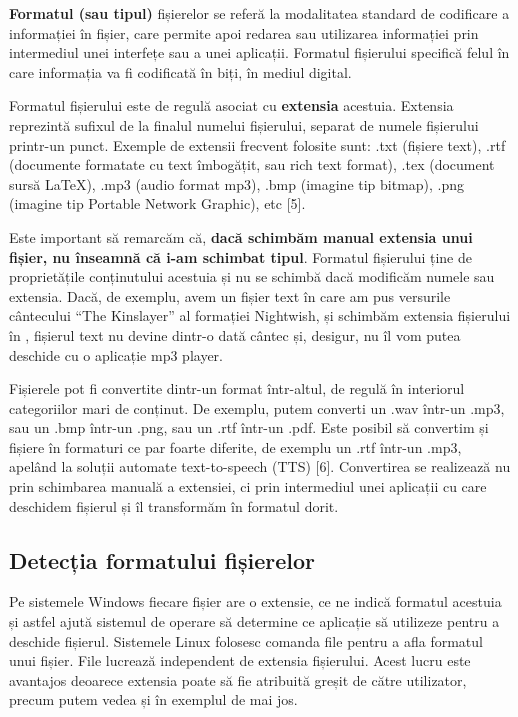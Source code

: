 \textbf{Formatul (sau tipul)} fișierelor se referă la modalitatea standard de
codificare a informației în fișier, care permite apoi redarea sau utilizarea
informației prin intermediul unei interfețe sau a unei aplicații. Formatul
fișierului specifică felul în care informația va fi codificată în biți, în
mediul digital.

Formatul fișierului este de regulă asociat cu \textbf{extensia} acestuia.
Extensia reprezintă sufixul de la finalul numelui fișierului, separat de numele
fișierului printr-un punct. Exemple de extensii frecvent folosite sunt: .txt
(fișiere text), .rtf (documente formatate cu text îmbogățit, sau rich text
format), .tex (document sursă LaTeX), .mp3 (audio format mp3), .bmp (imagine tip
bitmap), .png (imagine tip Portable Network Graphic), etc [5].

Este important să remarcăm că, \textbf{dacă schimbăm manual extensia unui
fișier, nu înseamnă că i-am schimbat tipul}. Formatul fișierului ține de
proprietățile conținutului acestuia și nu se schimbă dacă modificăm numele sau
extensia. Dacă, de exemplu, avem un fișier text în care am pus versurile
cântecului “The Kinslayer” al formației Nightwish, și schimbăm extensia
fișierului  în , fișierul text nu devine
dintr-o dată cântec și, desigur, nu îl vom putea deschide cu o aplicație mp3
player.

Fișierele pot fi convertite dintr-un format într-altul, de regulă în interiorul
categoriilor mari de conținut. De exemplu, putem converti un .wav într-un .mp3,
sau un .bmp într-un .png, sau un .rtf într-un .pdf. Este posibil să convertim și
fișiere în formaturi ce par foarte diferite, de exemplu un .rtf într-un .mp3,
apelând la soluții automate text-to-speech (TTS) [6]. Convertirea se realizează
nu prin schimbarea manuală a extensiei, ci prin intermediul unei aplicații cu
care deschidem fișierul și îl transformăm în formatul dorit.

\subsection{Detecția formatului fișierelor}

Pe sistemele Windows fiecare fișier are o extensie, ce ne indică formatul
acestuia și astfel ajută sistemul de operare să determine ce aplicație să
utilizeze pentru a deschide fișierul. Sistemele Linux folosesc comanda file
pentru a afla formatul unui fișier. File lucrează independent de extensia
fișierului. Acest lucru este avantajos deoarece extensia poate să fie atribuită
greșit de către utilizator, precum putem vedea și în exemplul de mai jos.

